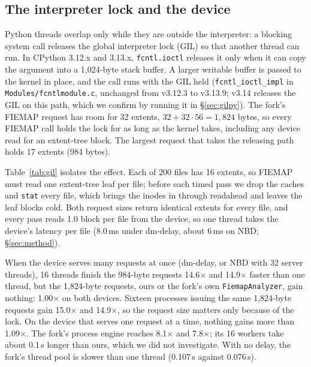 \subsection{The interpreter lock and the device}
\label{sec:gil}

Python threads overlap only while they are outside the interpreter: a blocking system
call releases the global interpreter lock (GIL) so that another thread can run. In
CPython 3.12.x and 3.13.x, \texttt{fcntl.ioctl} releases it only when it can copy the
argument into a 1{,}024-byte stack buffer. A larger writable buffer is passed to the
kernel in place, and the call runs with the GIL held (\texttt{fcntl\_ioctl\_impl} in
\texttt{Modules/fcntlmodule.c}, unchanged from v3.12.3 to v3.13.9; v3.14 releases
the GIL on this path, which we confirm by running it in \S\ref{sec:gilpy}). The fork's FIEMAP
request has room for 32 extents, $32 + 32\cdot56 = 1{,}824$ bytes, so every FIEMAP call
holds the lock for as long as the kernel takes, including any device read for an
extent-tree block. The largest request that takes the releasing path holds 17 extents
(984 bytes).

Table~\ref{tab:gil} isolates the effect. Each of 200 files has 16 extents, so FIEMAP
must read one extent-tree leaf per file; before each timed pass we drop the caches and
\texttt{stat} every file, which brings the inodes in through readahead and leaves the
leaf blocks cold. Both request sizes return identical extents for every file, and every
pass reads 1.0 block per file from the device, so one thread takes the device's
latency per file (8.0\,ms under dm-delay, about 6\,ms on NBD; \S\ref{sec:method}).

When the device serves many requests at once (dm-delay, or NBD with 32 server
threads), 16 threads finish the 984-byte requests 14.6$\times$ and 14.9$\times$ faster
than one thread, but the 1{,}824-byte requests, ours or the fork's own
\texttt{FiemapAnalyzer}, gain nothing: 1.00$\times$ on both devices. Sixteen processes
issuing the same 1{,}824-byte requests gain 15.0$\times$ and 14.9$\times$, so the
request size matters only because of the lock. On the device that serves one request at
a time, nothing gains more than 1.09$\times$. The fork's process engine reaches
8.1$\times$ and 7.8$\times$; its 16 workers take about 0.1\,s longer than ours, which we
did not investigate. With no delay, the fork's thread pool is slower than one thread
(0.107\,s against 0.076\,s).

\begin{table}[t]
\centering
\caption{Speedup of 16 workers over one for FIEMAP calls that each wait for one device
read, by request size, threads or processes, and device; the first column is the time
of one thread. Medians of five passes (95\% bootstrap intervals in
\texttt{results/numbers.json}).}
\label{tab:gil}
\small
{}
\end{table}


